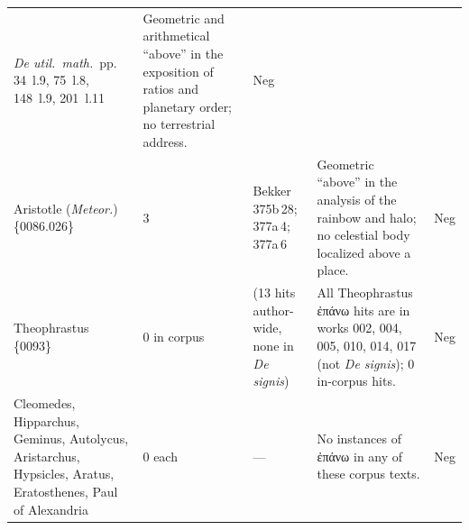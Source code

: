 \documentclass[11pt,a4paper]{article}
\newcommand{\grk}[1]{{\fontencoding{LGR}\selectfont #1}}
\newcommand{\grk}[1]{{\greekfont #1}}
\begin{document}
\begin{longtable}{@{}p{3.2cm}p{1.0cm}p{4.2cm}p{4.2cm}p{0.7cm}@{}}
  \textit{De util.\ math.}~pp.\,34~l.9, 75~l.8,
  148~l.9, 201~l.11 &
  Geometric and arithmetical ``above'' in the exposition of ratios and
  planetary order; no terrestrial address. & Neg \\[3pt]
Aristotle (\textit{Meteor.}) \{0086.026\} & 3 &
  Bekker 375b\,28; 377a\,4; 377a\,6 &
  Geometric ``above'' in the analysis of the rainbow and halo; no
  celestial body localized above a place. & Neg \\[3pt]
Theophrastus \{0093\} & 0 in corpus &
  (13 hits author-wide, none in
  \textit{De signis}) &
  All Theophrastus \grk{ἐπάνω} hits are in works 002, 004, 005, 010, 014,
  017 (not \textit{De signis}); 0 in-corpus hits. & Neg \\[3pt]
Cleomedes, Hipparchus, Geminus,
  Autolycus, Aristarchus,
  Hypsicles, Aratus, Eratosthenes,
  Paul of Alexandria & 0 each &
  --- & No instances of \grk{ἐπάνω} in any of these corpus texts. & Neg \\[6pt]


\end{longtable}
\end{document}
